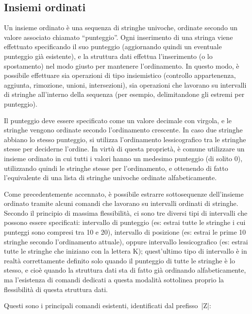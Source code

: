 \subsection{Insiemi ordinati}

Un insieme ordinato è una sequenza di stringhe univoche, ordinate secondo un valore associato
chiamato ``punteggio''. Ogni inserimento di una stringa viene effettuato specificando il suo
punteggio (aggiornando quindi un eventuale punteggio già esistente), e la struttura dati effettua
l'inserimento (o lo spostamento) nel modo giusto per mantenere l'ordinamento. In questo modo, è
possibile effettuare sia operazioni di tipo insiemistico (controllo appartenenza, aggiunta,
rimozione, unioni, intersezioni), sia operazioni che lavorano su intervalli di stringhe all'interno
della sequenza (per esempio, delimitandone gli estremi per punteggio).

Il punteggio deve essere specificato come un valore decimale con virgola, e le stringhe vengono
ordinate secondo l'ordinamento crescente. In caso due stringhe abbiano lo stesso punteggio, si
utilizza l'ordinamento lessicografico tra le stringhe stesse per deciderne l'ordine. In virtù di
questa proprietà, è comune utilizzare un insieme ordinato in cui tutti i valori hanno un medesimo
punteggio (di solito 0), utilizzando quindi le stringhe stesse per l'ordinamento, e ottenendo di
fatto l'equivalente di una lista di stringhe univoche ordinate alfabeticamente.

Come precedentemente accennato, è possibile estrarre sotto\-se\-quen\-ze dell'insieme ordinato tramite
alcuni comandi che lavorano su intervalli ordinati di stringhe. Secondo il principio di massima
flessibilità, ci sono tre diversi tipi di intervalli che possono essere specificati: intervallo di
punteggio (es: estrai tutte le stringhe i cui punteggi sono compresi tra 10 e 20), intervallo di
posizione (es: estrai le prime 10 stringhe secondo l'ordinamento attuale), oppure intervallo
lessicografico (es: estrai tutte le stringhe che iniziano con la lettera K); quest'ultimo tipo di
intervallo è in realtà correttamente definito solo quando il punteggio di tutte le stringhe è lo
stesso, e cioè quando la struttura dati sta di fatto già ordinando alfabeticamente, ma l'esistenza
di comandi dedicati a questa modalità sottolinea proprio la flessibilità di questa struttura dati.

Questi sono i principali comandi esistenti, identificati dal prefisso~\cverb|Z|:

